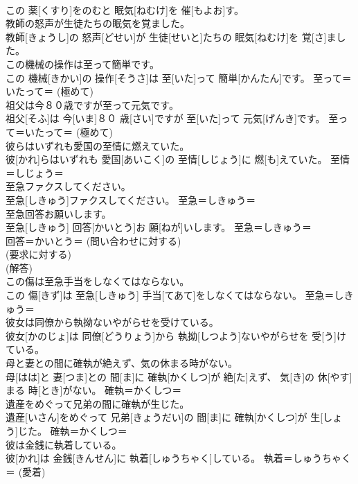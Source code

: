 \documentclass[8pt]{extreport}
\begin{document}
\begin{CJK}{UTF8}{min}
{\\	この 薬[くすり]をのむと 眠気[ねむけ]を 催[もよお]す。	
\\	教師の怒声が生徒たちの眠気を覚ました。	
\\	教師[きょうし]の 怒声[どせい]が 生徒[せいと]たちの 眠気[ねむけ]を 覚[さ]ました。	
\\	この機械の操作は至って簡単です。	
\\	この 機械[きかい]の 操作[そうさ]は 至[いた]って 簡単[かんたん]です。	至って＝いたって＝ (極めて) 
\\	祖父は今８０歳ですが至って元気です。	
\\	祖父[そふ]は 今[いま]８０ 歳[さい]ですが 至[いた]って 元気[げんき]です。	至って＝いたって＝ (極めて) 
\\	彼らはいずれも愛国の至情に燃えていた。	
\\	彼[かれ]らはいずれも 愛国[あいこく]の 至情[しじょう]に 燃[も]えていた。	至情＝しじょう＝ 
\\	至急ファクスしてください。	
\\	至急[しきゅう]ファクスしてください。	至急＝しきゅう＝ 
\\	至急回答お願いします。	
\\	至急[しきゅう] 回答[かいとう]お 願[ねが]いします。	至急＝しきゅう＝ 
\\	回答＝かいとう＝ (問い合わせに対する) 
\\	(要求に対する) 
\\	(解答)
\\	この傷は至急手当をしなくてはならない。	
\\	この 傷[きず]は 至急[しきゅう] 手当[てあて]をしなくてはならない。	至急＝しきゅう＝ 
\\	彼女は同僚から執拗ないやがらせを受けている。	
\\	彼女[かのじょ]は 同僚[どうりょう]から 執拗[しつよう]ないやがらせを 受[う]けている。	
\\	母と妻との間に確執が絶えず、気の休まる時がない。	
\\	母[はは]と 妻[つま]との 間[ま]に 確執[かくしつ]が 絶[た]えず、 気[き]の 休[やす]まる 時[とき]がない。	確執＝かくしつ＝ 
\\	遺産をめぐって兄弟の間に確執が生じた。	
\\	遺産[いさん]をめぐって 兄弟[きょうだい]の 間[ま]に 確執[かくしつ]が 生[しょう]じた。	確執＝かくしつ＝ 
\\	彼は金銭に執着している。	
\\	彼[かれ]は 金銭[きんせん]に 執着[しゅうちゃく]している。	執着＝しゅうちゃく＝ (愛着) 
}
\end{CJK}
\end{document}

